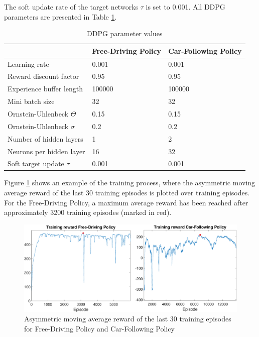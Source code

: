 \documentclass[review]{elsarticle}
\providecommand{\martinc}[1]{}                  %
\providecommand{\3}{{\ss}}
\begin{document}
	\martinc{Einheitenbehaftet, also in $\unit[]{m/s^2}$ oder
		ist der action space skaliert gem\"a\3 der 2. Komponente des State
		Vektors?} The soft update rate of the target networks $\tau$ is set to
	0.001.\martinc{Och, noch eine Tiefpass-Zeitvariable der Gr\"o\3e
		0.001. Welche von den beiden ist $\tau$?}
	All DDPG parameters are presented in Table \ref{tab:DDPGparameters}.
	\begin{table}
		\caption{DDPG parameter values} 
		\label{tab:DDPGparameters} 
		\begin{center}
			\begin{tabular}{ p{} p{0.2\textwidth}  p{} }
				& Free-Driving Policy & Car-Following Policy \\ \hline
				Learning rate & 0.001 & 0.001\\ 
				Reward discount factor & 0.95 & 0.95 \\ 
				Experience buffer length & 100000 & 100000 \\ 
				Mini batch size & 32 & 32 \\ 			
				Ornstein-Uhlenbeck  $\Theta$ & 0.15& 0.15 \\ 
				Ornstein-Uhlenbeck  $\sigma$ & 0.2 & 0.2 \\ 
				Number of hidden layers & 1 & 2\\
				Neurons per hidden layer & 16 & 32\\
				Soft target update  $\tau$ & 0.001 & 0.001\\
				
				
			\end{tabular}
		\end{center}
	\end{table}
	\martinc{Evtl. diese Abb vorziehen. Manche Journals wollen Bilder in
		der Reihenfolge der ersten Erwaehnung im Haupttext}
	Figure \ref{fig:TrainingReward} shows an example of the training
	process, where the asymmetric moving average reward of the last 30 training episodes is plotted over training episodes. For the Free-Driving Policy, a maximum average reward has been reached after approximately 3200 training episodes (marked in red).
	\begin{figure}
		\centering
		\includegraphics[width=12cm]{images/TrainingReward}
		\caption{Asymmetric moving average reward of the last 30 training episodes for Free-Driving Policy and Car-Following Policy} 
		\label{fig:TrainingReward}
	\end{figure}
	
\end{document}

